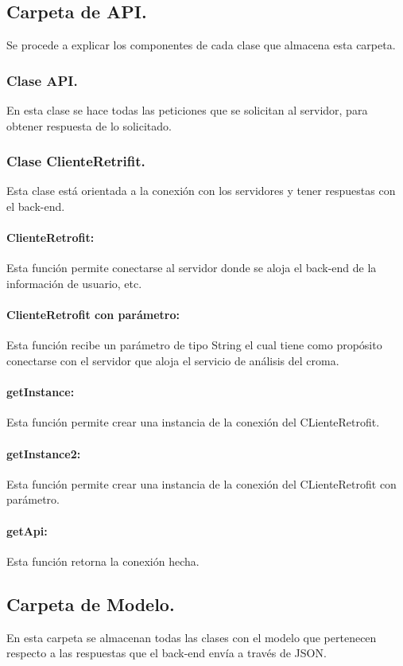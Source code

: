 \subsection{Carpeta de API.}
Se procede a explicar los componentes de cada clase que almacena esta carpeta.

\subsubsection{Clase API.}
En esta clase se hace todas las peticiones que se solicitan al servidor, para obtener respuesta de lo solicitado.

\subsubsection{Clase ClienteRetrifit.}
Esta clase está orientada a la conexión con los servidores y tener respuestas con el back-end.

\paragraph {ClienteRetrofit:} Esta función permite conectarse al servidor donde se aloja el back-end de la información 
de usuario, etc.
    
\paragraph {ClienteRetrofit con parámetro:} Esta función recibe un parámetro de tipo String el cual tiene como propósito 
conectarse con el servidor que aloja el servicio de análisis del croma.

\paragraph {getInstance:} Esta función permite crear una instancia de la conexión del CLienteRetrofit.
    
\paragraph {getInstance2:} Esta función permite crear una instancia de la conexión del CLienteRetrofit con parámetro.
    
\paragraph {getApi:} Esta función retorna la conexión hecha.


\subsection{Carpeta de Modelo.}
En esta carpeta se almacenan todas las clases con el modelo que pertenecen respecto a las respuestas que el back-end envía a través de JSON.